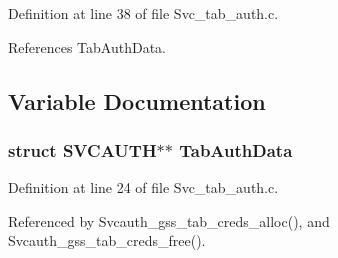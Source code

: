 Definition at line 38 of file Svc\_\-tab\_\-auth.c.

References Tab\-Auth\-Data.

\subsection{Variable Documentation}
\subsubsection{\setlength{\rightskip}{0pt plus 5cm}struct SVCAUTH$\ast$$\ast$ {\bf Tab\-Auth\-Data}}\label{Svc__tab__auth_8c_a2}




Definition at line 24 of file Svc\_\-tab\_\-auth.c.

Referenced by Svcauth\_\-gss\_\-tab\_\-creds\_\-alloc(), and Svcauth\_\-gss\_\-tab\_\-creds\_\-free().
